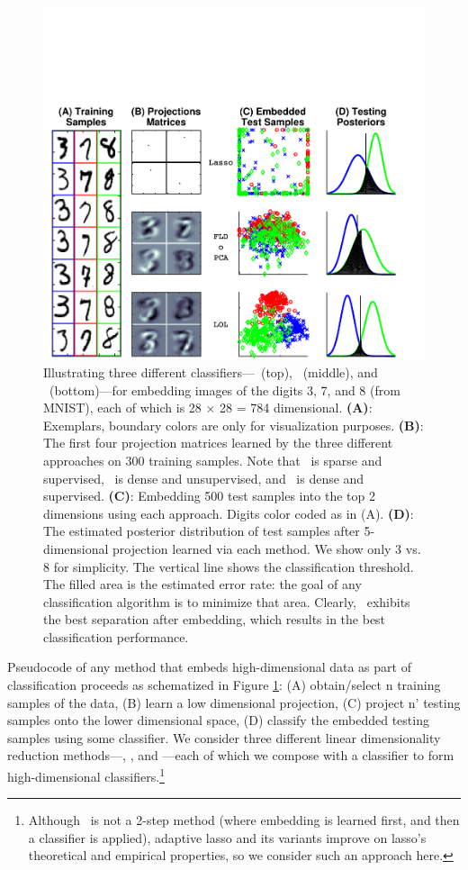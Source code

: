 \documentclass[10pt]{article}
\begin{document}
\begin{figure}
\centering %
\includegraphics[width=0.5\linewidth,trim=1cm 0cm 0cm 4.4cm,clip=true]{../Figs/mnist}
\caption{
Illustrating three different classifiers---~(top), ~(middle), and \Lol~(bottom)---for embedding images of the digits 3, 7, and 8 (from MNIST), each of which is 28 $\times$ 28 = 784 dimensional.  
\textbf{(A)}: Exemplars, boundary colors are only for visualization purposes.
\textbf{(B)}: The first four projection matrices learned by the three different approaches on 300 training samples. Note that ~is sparse and supervised, \Pca~is dense and unsupervised, and \Lol~is dense and supervised.
\textbf{(C)}: Embedding 500 test samples into the top 2 dimensions using each approach.  Digits color coded as in (A).
\textbf{(D)}:  The estimated posterior distribution of test samples after 
5-dimensional projection learned via each method.  
We show only 3 vs. 8 for simplicity.
The vertical line shows the classification threshold.
The filled area is the estimated error rate: the goal of any classification algorithm is to minimize that area. 
Clearly, \Lol~exhibits the best separation after embedding, which results in the best classification performance.
}
\label{fig:mnist}
\end{figure}

Pseudocode of any method that embeds high-dimensional data as part of classification proceeds as schematized in Figure \ref{fig:mnist}: 
(A) obtain/select n training samples of the data, 
(B) learn a low dimensional projection, 
(C) project n' testing samples onto the lower dimensional space, 
(D) classify the embedded testing samples using some classifier.  
We consider  three different linear dimensionality reduction methods---, \Pca, and \Lol---each of which we compose with a classifier to form high-dimensional classifiers.\footnote{Although ~is not a 2-step method (where embedding is learned first, and then a classifier is applied), adaptive lasso \cite{Zou2006a} and its variants improve on lasso's theoretical and empirical properties, so we consider such an approach here.}
\end{document}

